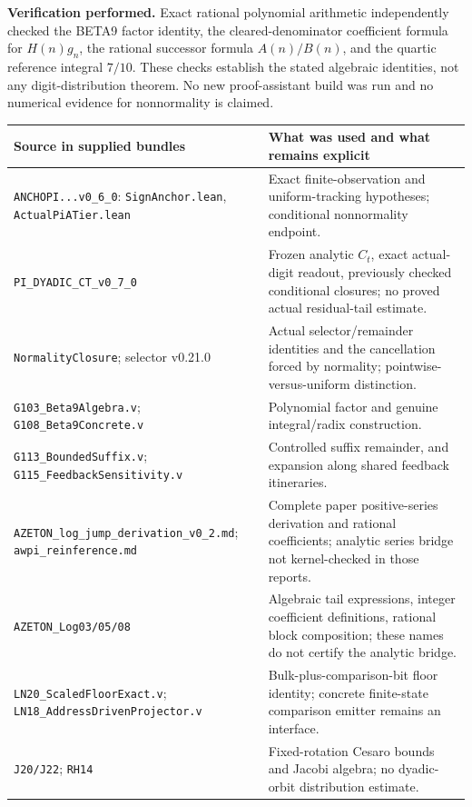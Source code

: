 \documentclass[10pt,a4paper]{article}
\begin{document}
\textbf{Verification performed.} Exact rational polynomial arithmetic independently checked the BETA9 factor identity, the cleared-denominator coefficient formula for $H(n)g_n$, the rational successor formula $A(n)/B(n)$, and the quartic reference integral $7/10$. These checks establish the stated algebraic identities, not any digit-distribution theorem. No new proof-assistant build was run and no numerical evidence for nonnormality is claimed.

\small
\renewcommand{\arraystretch}{1.2}
\begin{tabular}{>{\raggedright\arraybackslash}p{}>{\raggedright\arraybackslash}p{}}
\toprule
Source in supplied bundles & What was used and what remains explicit \\
\midrule
\texttt{ANCHOPI...v0\_6\_0}: \texttt{SignAnchor.lean}, \texttt{ActualPiATier.lean} & Exact finite-observation and uniform-tracking hypotheses; conditional nonnormality endpoint. \\
\texttt{PI\_DYADIC\_CT\_v0\_7\_0} & Frozen analytic $C_t$, exact actual-digit readout, previously checked conditional closures; no proved actual residual-tail estimate. \\
\texttt{NormalityClosure}; selector v0.21.0 & Actual selector/remainder identities and the cancellation forced by normality; pointwise-versus-uniform distinction. \\
\texttt{G103\_Beta9Algebra.v}; \texttt{G108\_Beta9Concrete.v} & Polynomial factor and genuine integral/radix construction. \\
\texttt{G113\_BoundedSuffix.v}; \texttt{G115\_FeedbackSensitivity.v} & Controlled suffix remainder, and expansion along shared feedback itineraries. \\
\texttt{AZETON\_log\_jump\_}\newline\texttt{derivation\_v0\_2.md}; \texttt{awpi\_reinference.md} & Complete paper positive-series derivation and rational coefficients; analytic series bridge not kernel-checked in those reports. \\
\texttt{AZETON\_Log03/05/08} & Algebraic tail expressions, integer coefficient definitions, rational block composition; these names do not certify the analytic bridge. \\
\texttt{LN20\_ScaledFloorExact.v}; \texttt{LN18\_AddressDrivenProjector.v} & Bulk-plus-comparison-bit floor identity; concrete finite-state comparison emitter remains an interface. \\
\texttt{J20/J22}; \texttt{RH14} & Fixed-rotation Cesaro bounds and Jacobi algebra; no dyadic-orbit distribution estimate. \\
\bottomrule
\end{tabular}
\normalsize
\end{document}
